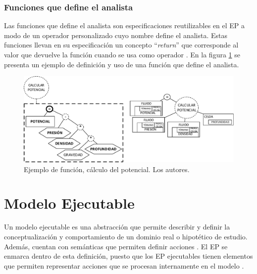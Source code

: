 \subsubsection{Funciones que define el analista}
Las funciones que define el analista son especificaciones reutilizables en el EP a modo de un operador personalizado cuyo nombre define el analista. Estas funciones llevan en su especificación un concepto ``\textit{return}'' que corresponde al valor que devuelve la función cuando se usa como operador \citep{JCalle}. En la figura \ref{fig:Potencial} se presenta un ejemplo de definición y uso de una función que define el analista.

\begin{figure}[h]
	\centering%
	\includegraphics[scale=0.8]{Fig/EjFuncion.pdf}%
	\caption[Ejemplo de función, cálculo del potencial.]{Ejemplo de función, cálculo del potencial. Los autores.} \label{fig:Potencial}
\end{figure}

\section{Modelo Ejecutable}
Un modelo ejecutable es una abstracción que permite describir y definir la conceptualización y comportamiento de un dominio real o hipotético de estudio. Además, cuentan con semánticas que permiten definir acciones \citep{ExecutableUML}. El EP se enmarca dentro de esta definición, puesto que los EP ejecutables tienen elementos que permiten representar acciones que se procesan internamente en el modelo \citep{JChaverra}. 
